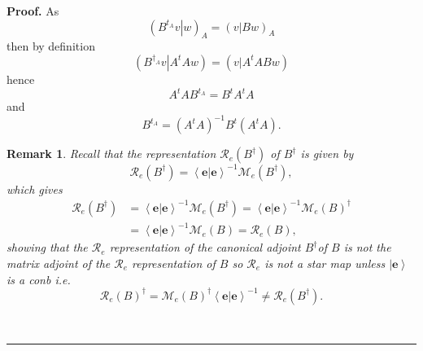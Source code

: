 \documentclass[aps,preprint]{revtex4}%
\newtheorem{remark}[theorem]{Remark}
\newenvironment{proof}[1][Proof]{\noindent\textbf{#1.} }{\ \rule{0.5em}{0.5em}}
\begin{document}
\begin{proof}
As%
\begin{equation}
\left(  \left.  B^{t_{A}}v\right\vert w\right)  _{A}=\left(  \left.
v\right\vert Bw\right)  _{A}%
\end{equation}
then by definition
\begin{equation}
\left(  \left.  B^{\dagger_{A}}v\right\vert A^{t}Aw\right)  =\left(  \left.
v\right\vert A^{t}ABw\right)
\end{equation}
hence
\begin{equation}
A^{t}AB^{t_{A}}=B^{t}A^{t}A
\end{equation}
and
\begin{equation}
B^{t_{A}}=\left(  A^{t}A\right)  ^{-1}B^{t}\left(  A^{t}A\right)  .
\end{equation}


\begin{remark}
Recall that the representation $\mathcal{R}_{e}\left(  B^{\dagger}\right)  $
of $B^{\dagger}$ is given by
\begin{equation}
\mathcal{R}_{e}\left(  B^{\dagger}\right)  =\left\langle \left.
\mathbf{e}\right\vert \mathbf{e}\right\rangle ^{-1}\mathcal{M}_{e}\left(
B^{\dagger}\right)  ,
\end{equation}
which gives
\begin{align}
\mathcal{R}_{e}\left(  B^{\dagger}\right)   &  =\left\langle \left.
\mathbf{e}\right\vert \mathbf{e}\right\rangle ^{-1}\mathcal{M}_{e}\left(
B^{\dagger}\right)  =\left\langle \left.  \mathbf{e}\right\vert \mathbf{e}%
\right\rangle ^{-1}\mathcal{M}_{e}\left(  B\right)  ^{\dagger}\\
&  =\left\langle \left.  \mathbf{e}\right\vert \mathbf{e}\right\rangle
^{-1}\mathcal{M}_{e}\left(  B\right)  =\mathcal{R}_{e}\left(  B\right)  ,
\end{align}
showing that the $\mathcal{R}_{e}$ representation of the canonical adjoint
$B^{\dagger}$of $B$ is not the matrix adjoint of the $\mathcal{R}_{e}$
representation of $B$ so $\mathcal{R}_{e}$ is not a star map unless
$\left\vert \mathbf{e}\right\rangle $ is a conb i.e.
\begin{equation}
\mathcal{R}_{e}\left(  B\right)  ^{\dagger}=\mathcal{M}_{e}\left(  B\right)
^{\dagger}\left\langle \left.  \mathbf{e}\right\vert \mathbf{e}\right\rangle
^{-1}\neq\mathcal{R}_{e}\left(  B^{\dagger}\right)  .
\end{equation}

\end{remark}


\end{proof}
\end{document}
